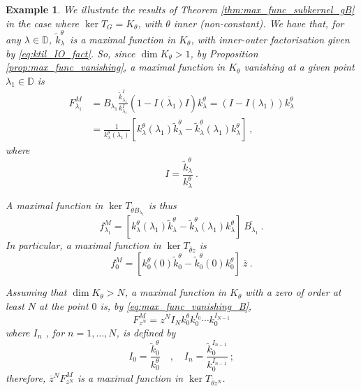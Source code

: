 \documentclass{article}
\numberwithin{equation}{section}
\theoremstyle{plain}
\newtheorem{ex}[thm]{Example}
\newcommand{\DD}{\ensuremath{\mathbb{D}}}
\newcommand{\ol}[1]{\ensuremath{\overline{#1}}}
\newcommand{\kktil}{\ensuremath{\tilde k^\theta_\lambda}}
\newcommand{\kk}{\ensuremath{k^\theta_\lambda}}
\begin{document}
\begin{ex}
We illustrate the results of Theorem  \ref{thm:max_func_subkernel_gB} in the case where $\ker T_G = K_\theta$, with $\theta$ inner (non-constant).
We have that, for any $\lambda\in\DD$, \kktil\ is a maximal function in $K_\theta$, with inner-outer factorisation given by \eqref{eq:ktil_IO_fact}.
So, since $\dim K_\theta >1$, by Proposition \ref{prop:max_func_vanishing}, a maximal function in $K_\theta$ vanishing at a given point $\lambda_1 \in \DD$ is 
\begin{align}
F^M_{\lambda_1} & = B_{\lambda_1} \frac{\tilde k^I_{\lambda_1}}{k^I_{\lambda_1}} (1- \ol{ I(\lambda_1) } I ) \kk = ( I - I(\lambda_1) ) \kk \nonumber \\
& = \frac{1}{\kk(\lambda_1)} [ \kk(\lambda_1) \kktil - \kktil(\lambda_1) \kk ]\ ,
\end{align}
where
\begin{equation}
I= \frac{\kktil}{\kk}\ .
\end{equation}

A maximal function in $\ker T_{\ol\theta B_{\lambda_1}}$ is thus
\begin{equation}
f^M_{\lambda_1} = [ \kk(\lambda_1) \kktil - \kktil(\lambda_1) \kk ] \ \ol{ B_{\lambda_1} }\ .
\end{equation}
In particular, a maximal function in $\ker T_{\ol\theta z}$ is
\begin{equation}
f^M_0 =  [ k^\theta_0(0) \tilde k^\theta_0 - \tilde k^\theta_0(0) k^\theta_0 ] \ \ol z\ .
\end{equation}

Assuming that $\dim K_\theta >N$, a maximal function in $K_\theta$ with a zero of order at least $N$ at the point $0$ is, by \eqref{eq:max_func_vanishing_B},
\begin{equation}
F^M_{z^N} = z^N I_N k_0^\theta k_0^{I_0} \cdots k_0^{I_{N-1}}
\end{equation}
where $I_n$ , for $n=1,\dots,N$, is defined by
\begin{equation}
I_0 = \frac{\tilde k_0^\theta}{k_0^\theta} \quad , \quad I_n = \frac{\tilde k_0^{I_{n-1}}}{k_0^{I_{n-1}}}\ ;
\end{equation}
therefore, $\ol z^N F^M_{z^N}$ is a maximal function in $\ker T_{\ol\theta z^N}$.
\end{ex}





\end{document}
